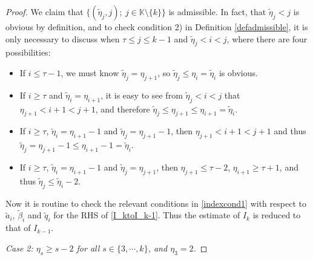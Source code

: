 \documentclass[11pt,reqno]{amsart}
\numberwithin{equation}{section}
\theoremstyle{definition}
\begin{document}
\begin{proof}
	We claim that $\{(\tilde{\eta}_j,j);~j\in\mathbb{K}\setminus\{k\}\}$ is admissible. In fact, that $\tilde{\eta}_j<j$ is obvious by definition, and to check condition 2) in Definition \ref{defadmissible}, it is only necessary to discuss when $\tau\leq j\leq k-1$ and $\tilde{\eta}_j<i<j$, where there are four possibilities:
	\begin{itemize}
		\item[1)] If $i\leq\tau-1$, we must know $\tilde{\eta}_j=\eta_{j+1}$, so $\tilde{\eta}_j\leq\eta_i=\tilde{\eta}_i$ is obvious.
		
		\item[2)] If $i\geq\tau$ and $\tilde{\eta}_i=\eta_{i+1}$, it is easy to see from $\tilde{\eta}_j<i<j$ that $\eta_{j+1}<i+1<j+1$, and therefore $\tilde{\eta}_j\leq\eta_{j+1}\leq\eta_{i+1}=\tilde{\eta}_i$.
		
		\item[3)] If $i\geq\tau$, $\tilde{\eta}_i=\eta_{i+1}-1$ and $\tilde{\eta}_j=\eta_{j+1}-1$, then $\eta_{j+1}<i+1<j+1$ and thus $\tilde{\eta}_j=\eta_{j+1}-1\leq\eta_{i+1}-1=\tilde{\eta}_i$.
		
		\item[4)] If $i\geq\tau$, $\tilde{\eta}_i=\eta_{i+1}-1$ and $\tilde{\eta}_j=\eta_{j+1}$, then $\eta_{j+1}\leq\tau-2$, $\eta_{i+1}\geq\tau+1$, and thus $\tilde{\eta}_j\leq\tilde{\eta}_i-2$.
	\end{itemize}
	
	Now it is routine to check the relevant conditions in \eqref{indexcond1} with respect to $\tilde{a}_i$, $\tilde{\beta}_i$ and $\tilde{q}_i$ for the RHS of \eqref{I_ktoI_k-1}. Thus the estimate of $I_k$ is reduced to that of $I_{k-1}$.
	
	\noindent\emph{Case 2: $\eta_s\geq s-2$ for all $s\in\{3,\cdots,k\}$, and $\eta_3=2$.}
	

\end{proof}
\end{document}
